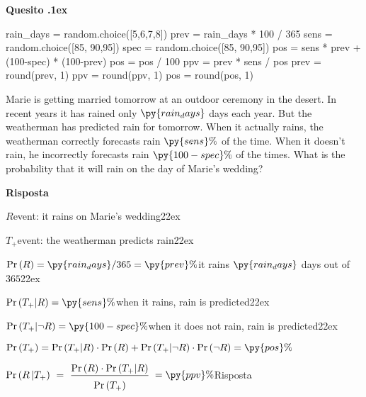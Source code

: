 \documentclass[11pt,twoside,a4paper]{article}
\def\Pr{{\rm Pr\,}}
\newcounter{quesito}
\newenvironment{question}{\bigskip\addtocounter{quesito}{1}\par\textbf{Quesito \thequesito.\kern1ex}}{\vspace{\parskip}}
\newenvironment{answer}{\par\textbf{Risposta\quad}}{\vspace{\parskip}}
\begin{document}
\begin{question}
\def\Pr{{\rm Pr\,}}
\begin{pycode}
rain_days = random.choice([5,6,7,8])
prev = rain_days * 100 / 365
sens =  random.choice([85, 90,95])
spec = random.choice([85, 90,95])
pos =  sens * prev + (100-spec) * (100-prev)
pos = pos / 100
ppv =  prev * sens  / pos
prev = round(prev, 1)
ppv = round(ppv, 1)
pos = round(pos, 1)
\end{pycode}
Marie is getting married tomorrow at an outdoor ceremony in the desert. In recent years it has rained only $\py{rain_days}$ days each year. But the weatherman has predicted rain for tomorrow. When it actually rains, the weatherman correctly forecasts rain $\py{sens}\%$ of the time. When it doesn’t rain, he incorrectly forecasts rain $\py{100-spec}\%$ of the times. What is the probability that it will rain on the day of Marie’s wedding?

\begin{answer}

$R$\hfill event: it rains on Marie’s wedding\kern22ex

$T_+$\hfill event: the weatherman predicts rain\kern22ex

$\Pr(R) =\py{rain_days}/365 = \py{prev}\%$\hfill it rains $\py{rain_days}$ days out of $365$\kern22ex

$\Pr(T_+|R) = \py{sens}\%$\hfill when it rains, rain is predicted\kern22ex

$\Pr(T_+|\neg R) = \py{100-spec}\%$\hfill when it does not rain,  rain is predicted\kern22ex

$\Pr(T_+) = \Pr(T_+|R)\cdot \Pr(R)+ \Pr(T_+|\neg R)\cdot \Pr(\neg R) = \py{pos}\%$ 

$\displaystyle \Pr(R\,| T_+)\ =\ \frac{\Pr(R)\cdot \Pr(T_+|R)}{\Pr(T_+)\vphantom{\Big[}}$  {\color{blue} $=\py{ppv}\%$\hfill Risposta}

\end{answer}
\end{question}
\end{document}
